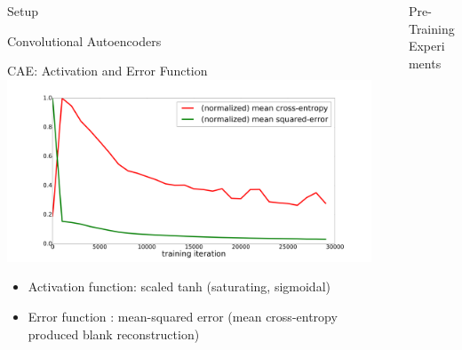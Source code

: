\documentclass[final]{beamer}
\newlength{\sepwid}
\newlength{\onecolwid}
\newlength{\threecolwid}
\begin{document}
\begin{frame}[t]
\begin{columns}[t]
\begin{column}{\onecolwid}
\begin{alertblock}{Setup}
\begin{block}{Convolutional Autoencoders}
\end{block}

\begin{block}{CAE: Activation and Error Function}
	\centering
	\includegraphics[width=.7\linewidth]{graphics/mse_ce_comparison.png}

	\begin{itemize}
		\item Activation function: scaled tanh (saturating, sigmoidal)
		\item Error function     : mean-squared error (mean cross-entropy produced blank reconstruction)
	\end{itemize}

\end{block}


\end{alertblock}


\end{column} %


\begin{column}{\sepwid}\end{column} %


\begin{column}{\threecolwid}


\begin{alertblock}{Pre-Training Experiments}

\centering

\begin{columns}[t, totalwidth=0.9\threecolwid] %





\end{columns}
\end{alertblock}
\end{column}
\end{columns}
\end{frame}
\end{document}
